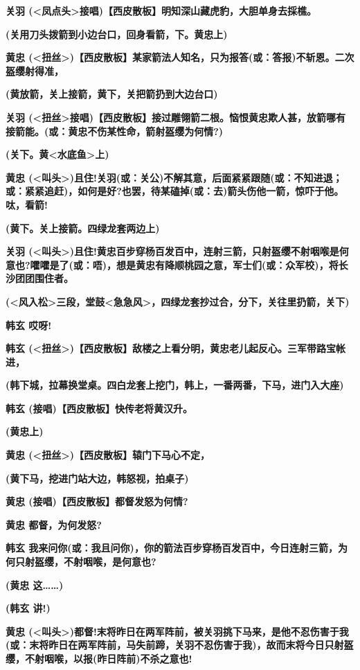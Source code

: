 \textbf{关羽
(\textless{}凤点头\textgreater{}接唱)【西皮散板】明知深山藏虎豹，大胆单身去採樵。}

\textbf{(关用刀头拨箭到小边台口，回身看箭，下。黄忠上)}

\textbf{黄忠
(\textless{}扭丝\textgreater{})【西皮散板】某家箭法人知名，只为报答(或：答报)不斩恩。二次盔缨射得准，}

\textbf{(黄放箭，关上接箭，黄下，关把箭扔到大边台口)}

\textbf{关羽
(\textless{}扭丝\textgreater{}接唱)【西皮散板】接过雕翎箭二根。恼恨黄忠欺人甚，放箭哪有接箭能。(或：黄忠不伤某性命，箭射盔缨为何情?)}

\textbf{(关下。黄\textless{}水底鱼\textgreater{}上)}

\textbf{黄忠
(\textless{}叫头\textgreater{})且住!关羽(或：关公)不解其意，后面紧紧跟随(或：不知进退；或：紧紧追赶)，如何是好?也罢，待某磕掉(或：去)箭头伤他一箭，惊吓于他。呔，看箭!}

\textbf{(黄下。关上接箭。四绿龙套两边上)}

\textbf{关羽
(\textless{}叫头\textgreater{})且住!黄忠百步穿杨百发百中，连射三箭，只射盔缨不射咽喉是何意也?嚯嚯是了(或：唔)，想是黄忠有降顺桃园之意，军士们(或：众军校)，将长沙团团围住者。}

\textbf{(\textless{}风入松\textgreater{}三段，堂鼓\textless{}急急风\textgreater{}，四绿龙套抄过合，分下，关往里扔箭，关下)}

\textbf{韩玄 哎呀!}

\textbf{韩玄
(\textless{}扭丝\textgreater{})【西皮散板】敌楼之上看分明，黄忠老儿起反心。三军带路宝帐进，}

\textbf{(韩下城，拉幕换堂桌。四白龙套上挖门，韩上，一番两番，下马，进门入大座)}

\textbf{韩玄 (接唱)【西皮散板】快传老将黄汉升。}

\textbf{(黄忠上)}

\textbf{黄忠
(\textless{}扭丝\textgreater{})【西皮散板】辕门下马心不定，}

\textbf{(黄下马，挖进门站大边，韩怒视，拍桌子)}

\textbf{黄忠 (接唱)【西皮散板】都督发怒为何情?}

\textbf{黄忠 都督，为何发怒?}

\textbf{韩玄
我来问你(或：我且问你)，你的箭法百步穿杨百发百中，今日连射三箭，为何只射盔缨，不射咽喉，是何意也?}

\textbf{(黄忠 这\ldots{}\ldots{})}

\textbf{(韩玄 讲!)}

\textbf{黄忠
(\textless{}叫头\textgreater{})都督!末将昨日在两军阵前，被关羽挑下马来，是他不忍伤害于我(或：末将昨日在两军阵前，马失前蹄，关羽不忍伤害于我)，故而末将今日只射盔缨，不射咽喉，以报(昨日阵前)不杀之意也!}

